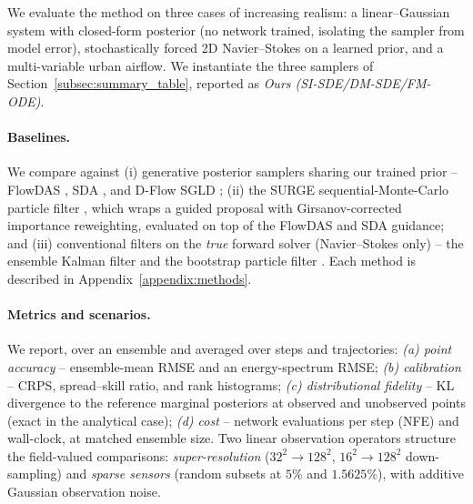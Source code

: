 
\newcommand{\figbox}[3]{%
  \setlength{\fboxsep}{2pt}%
  \fcolorbox{gray!55}{gray!12}{%
    \parbox[c][#2][c]{#1}{\centering\ttfamily\scriptsize
      [figure placeholder]\\[2pt]#3}}%
}

We evaluate the method on three cases of increasing realism: a linear--Gaussian system with closed-form posterior (no network trained, isolating the sampler from model error), stochastically forced 2D Navier--Stokes on a learned prior, and a multi-variable urban airflow. We instantiate the three samplers of Section~\ref{subsec:summary_table}, reported as \emph{Ours (SI-SDE/DM-SDE/FM-ODE)}.

\paragraph{Baselines.}
We compare against (i) generative posterior samplers sharing our trained prior -- FlowDAS \cite{chen_flowdas_2025}, SDA \cite{rozet_score-based_2023}, and D-Flow SGLD \cite{parikh_d-flow_2026,ben-hamu_d-flow_2024}; (ii) the SURGE sequential-Monte-Carlo particle filter \cite{wei_surge_2026}, which wraps a guided proposal with Girsanov-corrected importance reweighting, evaluated on top of the FlowDAS and SDA guidance; and (iii) conventional filters on the \emph{true} forward solver (Navier--Stokes only) -- the ensemble Kalman filter \cite{evensen_data_2022} and the bootstrap particle filter \cite{carrassi_data_2018}. Each method is described in Appendix~\ref{appendix:methods}.

\paragraph{Metrics and scenarios.}
We report, over an ensemble and averaged over steps and trajectories: \emph{(a) point accuracy} -- ensemble-mean RMSE and an energy-spectrum RMSE; \emph{(b) calibration} -- CRPS, spread--skill ratio, and rank histograms; \emph{(c) distributional fidelity} -- KL divergence to the reference marginal posteriors at observed and unobserved points (exact in the analytical case); \emph{(d) cost} -- network evaluations per step (NFE) and wall-clock, at matched ensemble size. Two linear observation operators structure the field-valued comparisons: \emph{super-resolution} ($32^2\!\to\!128^2$, $16^2\!\to\!128^2$ down-sampling) and \emph{sparse sensors} (random subsets at $5\%$ and $1.5625\%$), with additive Gaussian observation noise.

